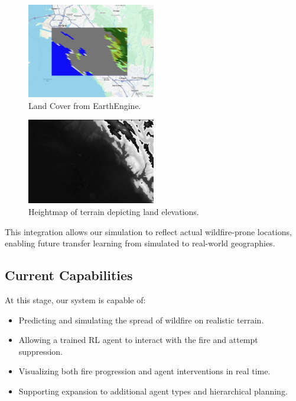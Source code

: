 \documentclass[conference]{IEEEtran}
\begin{document}
\begin{figure}[h!]
    \centering
    \includegraphics[width=0.5\textwidth]{landcover.png}
    \caption{Land Cover from EarthEngine.}
    
\end{figure}

\begin{figure}[h!]
    \centering
    \includegraphics[width=0.5\textwidth]{heightmap.png}
    \caption{Heightmap of terrain depicting land elevations.}
\end{figure}

\noindent
This integration allows our simulation to reflect actual wildfire-prone locations, enabling future transfer learning from simulated to real-world geographies.

\subsection{Current Capabilities}
At this stage, our system is capable of:

\begin{itemize}
    \item Predicting and simulating the spread of wildfire on realistic terrain.
    \item Allowing a trained RL agent to interact with the fire and attempt suppression.
    \item Visualizing both fire progression and agent interventions in real time.
    \item Supporting expansion to additional agent types and hierarchical planning.
\end{itemize}
\end{document}
